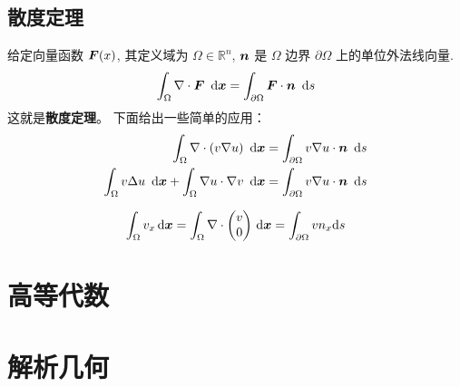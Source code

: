 \documentclass{article}
\begin{document}
\subsection{散度定理}
给定向量函数 ${\boldsymbol F}(x)$, 其定义域为 $\Omega\in\mathbb R^n$, ${\boldsymbol n}$ 是 $\Omega$ 边界 $\partial \Omega$ 上的单位外法线向量.
$$
\int_{\Omega} \nabla\cdot{\boldsymbol F}~ \,\mathrm d {\boldsymbol x} = \int_{\partial \Omega}{\boldsymbol F}\cdot{\boldsymbol n} ~\,\mathrm d s
$$
这就是{\bf 散度定理}。 下面给出一些简单的应用：
$$
\begin{aligned}
\int_{\Omega} \nabla\cdot(v\nabla u)~\,\mathrm d {\boldsymbol x} &= \int_{\partial\Omega} v\nabla
u\cdot{\boldsymbol n}~\,\mathrm d s\\
\int_{\Omega} v\Delta u~\,\mathrm d {\boldsymbol x} + \int_{\Omega}\nabla u\cdot\nabla v~\,\mathrm d {\boldsymbol x}
&= \int_{\partial\Omega} v\nabla u\cdot{\boldsymbol n}~\,\mathrm d s
\end{aligned}
$$

$$
\int_\Omega v_x \,\mathrm d{\boldsymbol x} = \int_\Omega \nabla\cdot \begin{pmatrix}
v\\0
\end{pmatrix} \,\mathrm d {\boldsymbol x} =
\int_{\partial \Omega} vn_x \mathrm d s
$$

\section{高等代数}

\section{解析几何}

\cite{wei_fealpy}


\end{document}
